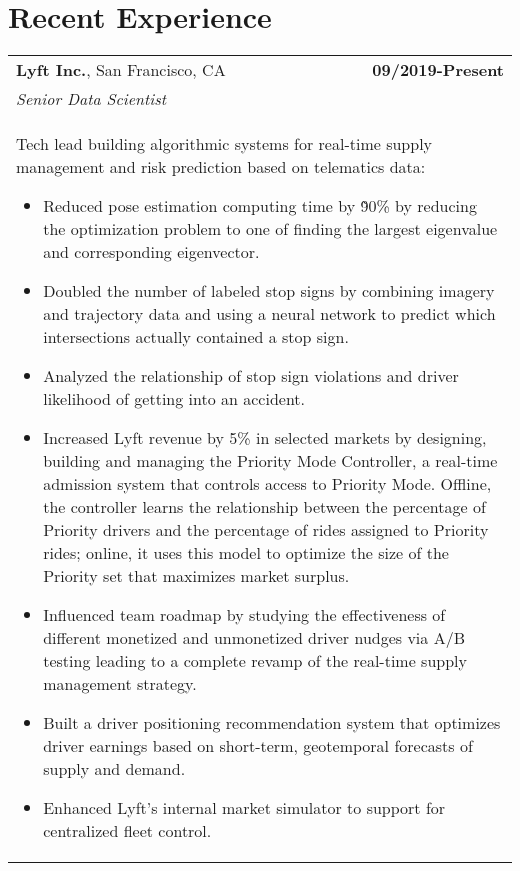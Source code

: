 \documentclass[a4paper,10pt]{article}
\begin{document}
\section{Recent Experience}
\begin{tabularx}{\textwidth}{Xr}

 {\bf{Lyft Inc.}}, San Francisco, CA & \bf{09/2019-Present}\\
 \emph{Senior Data Scientist} &\\
 \multicolumn{2}{p{0.98\textwidth}}{
 Tech lead building algorithmic systems for real-time supply management and risk prediction based on telematics data:
 \begin{itemize}
    \item Reduced pose estimation computing time by \~90\% by reducing the optimization problem to one of finding the largest eigenvalue and corresponding eigenvector.
    \item Doubled the number of labeled stop signs by combining imagery and trajectory data and using a neural network to predict which intersections actually contained a stop sign.
    \item Analyzed the relationship of stop sign violations and driver likelihood of getting into an accident.
 	\item Increased Lyft revenue by 5\% in selected markets by designing, building and managing the Priority Mode Controller, a real-time admission system that controls access to Priority Mode. Offline, the controller learns the relationship between the percentage of Priority drivers and the percentage of rides assigned to Priority rides; online, it uses this model to optimize the size of the Priority set that maximizes market surplus.
 	\item Influenced team roadmap by studying the effectiveness of different monetized and unmonetized driver nudges via A/B testing leading to a complete revamp of the real-time supply management strategy.
 	\item Built a driver positioning recommendation system that optimizes driver earnings based on short-term, geotemporal forecasts of supply and demand.
 	\item Enhanced Lyft's internal market simulator to support for centralized fleet control.
 \end{itemize}
 }\\


\end{tabularx}
\end{document}
